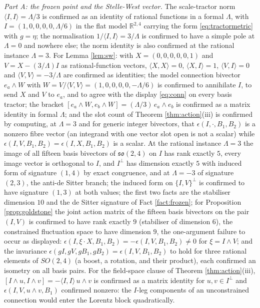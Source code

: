 \documentclass[11pt]{article}
\theoremstyle{definition}
\newcommand{\ip}[2]{\langle #1, #2\rangle}
\begin{document}
\emph{Part A: the frozen point and the Stelle-West vector.} The scale-tractor norm $\langle I, I \rangle = \Lambda/3$ is confirmed as an identity of rational functions in a formal $\Lambda$, with $I = (1, 0, 0, 0, 0, \Lambda/6)$ in the flat model $\mathbb{R}^{2,4}$ carrying the form \eqref{eq:tractormetric} with $g = \eta$; the normalisation $1/\langle I, I\rangle = 3/\Lambda$ is confirmed to have a simple pole at $\Lambda = 0$ and nowhere else; the norm identity is also confirmed at the rational instance $\Lambda = 3$. For Lemma \ref{lem:sw}: with $X = (0,0,0,0,0,1)$ and $V = X - (3/\Lambda)I$ as rational-function vectors, $\langle X, X\rangle = 0$, $\langle X, I\rangle = 1$, $\langle V, I\rangle = 0$ and $\langle V, V\rangle = -3/\Lambda$ are confirmed as identities; the model connection bivector $e_a\wedge W$ with $W = V/\langle V,V\rangle = (1,0,0,0,0,-\Lambda/6)$ is confirmed to annihilate $I$, to send $X$ and $V$ to $e_a$, and to agree with the display \eqref{eq:conn} on every basis tractor; the bracket $[e_a\wedge W, e_b\wedge W] = (\Lambda/3)\,e_a\wedge e_b$ is confirmed as a matrix identity in formal $\Lambda$; and the slot count of Theorem \ref{thm:action}(iii) is confirmed by computing, at $\Lambda = 3$ and for generic integer bivectors, that $\epsilon(I, \cdot, B_1, B_2)$ is a nonzero fibre vector (an integrand with one vector slot open is not a scalar) while $\epsilon(I, V, B_1, B_2) = \epsilon(I, X, B_1, B_2)$ is a scalar. At the rational instance $\Lambda = 3$ the image of all fifteen basis bivectors of $\mathfrak{so}(2,4)$ on $I$ has rank exactly $5$, every image vector is orthogonal to $I$, and $I^{\perp}$ has dimension exactly $5$ with induced form of signature $(1,4)$ by exact congruence, and at $\Lambda = -3$ of signature $(2,3)$, the anti-de Sitter branch; the induced form on $\{I,V\}^\perp$ is confirmed to have signature $(1,3)$ at both values; the first two facts are the stabiliser dimension $10$ and the de Sitter signature of Fact \ref{fact:frozen}; for Proposition \ref{prop:goldstone} the joint action matrix of the fifteen basis bivectors on the pair $(I, V)$ is confirmed to have rank exactly $9$ (stabiliser of dimension $6$), the constrained fluctuation space to have dimension $9$, the one-argument failure to occur as displayed: $\epsilon(I, \xi\cdot X, B_1, B_2) = -\epsilon(I, V, B_1, B_2) \neq 0$ for $\xi = I\wedge V$; and the invariance $\epsilon(gI, gV, gB_1, gB_2) = \epsilon(I, V, B_1, B_2)$ to hold for three rational elements of $SO(2,4)$ (a boost, a rotation, and their product), each confirmed an isometry on all basis pairs. For the field-space clause of Theorem \ref{thm:action}(iii), $[I\wedge u, I\wedge v] = -\ip{I}{I}\,u\wedge v$ is confirmed as a matrix identity for $u, v \in I^\perp$ and $\epsilon(I, V, u\wedge v, B_1)$ confirmed nonzero: the $I$-leg components of an unconstrained connection would enter the Lorentz block quadratically.
\end{document}
